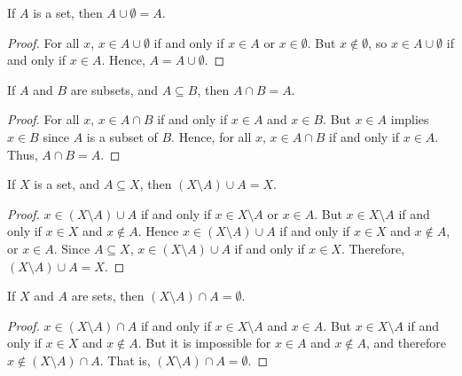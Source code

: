             \begin{theorem}
                If $A$ is a set, then $A\cup\emptyset=A$.
            \end{theorem}
            \begin{proof}
                For all $x$, $x\in{A}\cup\emptyset$ if and only if
                $x\in{A}$ or $x\in\emptyset$. But $x\notin\emptyset$, so
                $x\in{A}\cup\emptyset$ if and only if $x\in{A}$. Hence,
                $A=A\cup\emptyset$.
            \end{proof}
            \begin{theorem}
                If $A$ and $B$ are subsets, and $A\subseteq{B}$, then
                $A\cap{B}=A$.
            \end{theorem}
            \begin{proof}
                For all $x$, $x\in{A}\cap{B}$ if and only if $x\in{A}$ and
                $x\in{B}$. But $x\in{A}$ implies $x\in{B}$ since $A$ is a subset
                of $B$. Hence, for all $x$, $x\in{A}\cap{B}$ if and only if
                $x\in{A}$. Thus, $A\cap{B}=A$.
            \end{proof}
            \begin{theorem}
                If $X$ is a set, and $A\subseteq{X}$, then
                $(X\setminus{A})\cup{A}=X$.
            \end{theorem}
            \begin{proof}
                $x\in(X\setminus{A})\cup{A}$ if and only if
                $x\in{X}\setminus{A}$ or $x\in{A}$. But $x\in{X}\setminus{A}$
                if and only if $x\in{X}$ and $x\notin{A}$. Hence
                $x\in(X\setminus{A})\cup{A}$ if and only if
                $x\in{X}$ and $x\notin{A}$, or $x\in{A}$. Since $A\subseteq{X}$,
                $x\in(X\setminus{A})\cup{A}$ if and only if $x\in{X}$.
                Therefore, $(X\setminus{A})\cup{A}=X$.
            \end{proof}
            \begin{theorem}
                If $X$ and $A$ are sets, then
                $(X\setminus{A})\cap{A}=\emptyset$.
            \end{theorem}
            \begin{proof}
                $x\in(X\setminus{A})\cap{A}$ if and only if
                $x\in{X}\setminus{A}$ and $x\in{A}$. But
                $x\in{X}\setminus{A}$ if and only if $x\in{X}$ and
                $x\notin{A}$. But it is impossible for $x\in{A}$ and
                $x\notin{A}$, and therefore $x\notin(X\setminus{A})\cap{A}$.
                That is, $(X\setminus{A})\cap{A}=\emptyset$.
            \end{proof}
